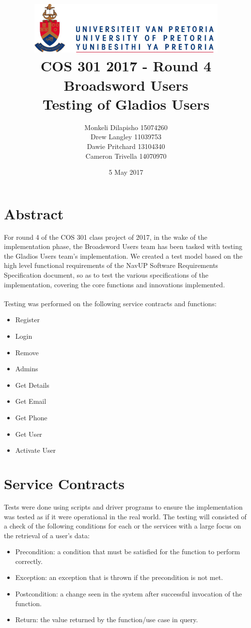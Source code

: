 \documentclass[12pt]{article}
\title{ \includegraphics[width=10cm]{up} \\ [0.5cm] COS 301 2017 - Round 4\\ Broadsword Users\\ Testing of Gladios Users }
\author{Monkeli Dilapisho \hfill 15074260 \\ Drew Langley \hfill 11039753 \\ Dawie Pritchard \hfill 13104340 \\ Cameron Trivella \hfill 14070970}
\date{5 May 2017}
\begin{document}
\maketitle
\pagebreak
\tableofcontents
\pagebreak


\section{Abstract}
	For round 4 of the COS 301 class project of 2017, in the wake of the implementation phase, the Broadsword Users team has been tasked with testing the Gladios Users team's 		implementation. We created a test model based on the high level functional requirements of the NavUP Software Requirements Specification document, so as to test the various 		specifications of the implementation, covering the core functions and innovations implemented.
	\\ \\
	Testing was performed on the following service contracts and functions:
	
	\begin{itemize}
		\item Register
		\item Login
		\item Remove
		\item Admins
		\item Get Details
		\item Get Email
		\item Get Phone 
		\item Get User
		\item Activate User
	\end{itemize}	

\pagebreak

\section{Service Contracts}
	Tests were done using scripts and driver programs to ensure the implementation was tested as if it were operational in the real world.	
	\noindent The testing will consisted of a check of the following conditions for each or the services with a large focus on the retrieval of a user's data:\\
 	
 	\begin{itemize}
		\item Precondition: a condition that must be satisfied for the function to perform correctly.
		\item Exception: an exception that is thrown if the precondition is not met.
		\item Postcondition: a change seen in the system after successful invocation of the function.
		\item Return: the value returned by the function/use case in query.
	\end{itemize}
		
\end{document}
